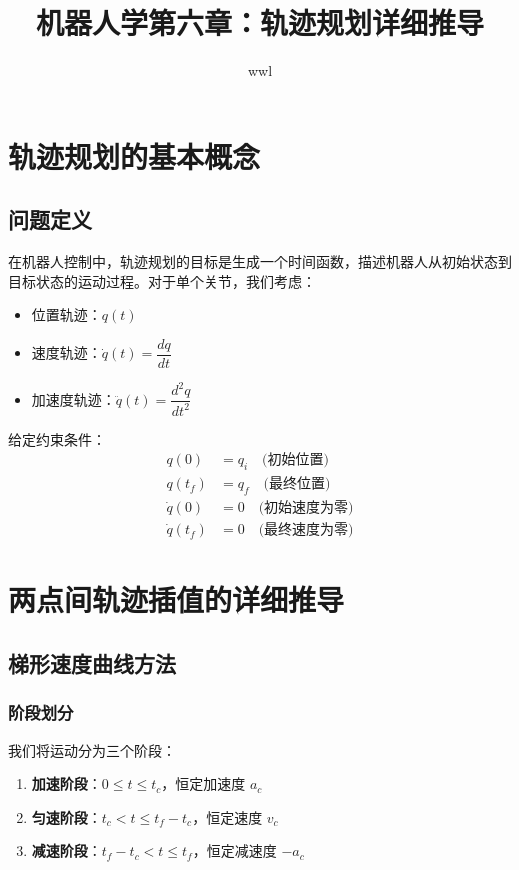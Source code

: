 \documentclass[12pt,a4paper]{article}
\title{\textbf{机器人学第六章：轨迹规划详细推导}}
\author{wwl}
\date{}
\begin{document}
\maketitle

\section{轨迹规划的基本概念}

\subsection{问题定义}

在机器人控制中，轨迹规划的目标是生成一个时间函数，描述机器人从初始状态到目标状态的运动过程。对于单个关节，我们考虑：

\begin{itemize}
    \item 位置轨迹：$q(t)$
    \item 速度轨迹：$\dot{q}(t) = \dfrac{dq}{dt}$
    \item 加速度轨迹：$\ddot{q}(t) = \dfrac{d^2q}{dt^2}$
\end{itemize}

给定约束条件：
\begin{align*}
    q(0) &= q_i \quad \text{(初始位置)} \\
    q(t_f) &= q_f \quad \text{(最终位置)} \\
    \dot{q}(0) &= 0 \quad \text{(初始速度为零)} \\
    \dot{q}(t_f) &= 0 \quad \text{(最终速度为零)}
\end{align*}

\section{两点间轨迹插值的详细推导}

\subsection{梯形速度曲线方法}

\subsubsection{阶段划分}

我们将运动分为三个阶段：

\begin{enumerate}
    \item \textbf{加速阶段}：$0 \leq t \leq t_c$，恒定加速度 $a_c$
    \item \textbf{匀速阶段}：$t_c < t \leq t_f - t_c$，恒定速度 $v_c$
    \item \textbf{减速阶段}：$t_f - t_c < t \leq t_f$，恒定减速度 $-a_c$
\end{enumerate}
\end{document}
